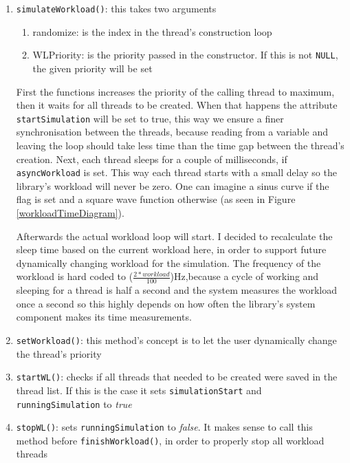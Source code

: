 \begin{enumerate}
	\item \texttt{simulateWorkload()}: this takes two arguments
	\begin{enumerate}
		\item randomize: is the index in the thread's construction loop
		\item WLPriority: is the priority passed in the constructor. If this is not \texttt{NULL}, the given priority will be set
	\end{enumerate}
	First the functions increases the priority of the calling thread to maximum, then it waits for all threads to be created. When that happens the attribute \texttt{startSimulation} will be set to true, this way we ensure a finer synchronisation between the threads, because reading from a variable and leaving the loop should take less time than the time gap between the thread's creation. Next, each thread sleeps for a couple of milliseconds, if \texttt{asyncWorkload} is set. This way each thread starts with a small delay so the library's workload will never be zero. One can imagine a sinus curve if the flag is set and a square wave function otherwise (as seen in Figure \ref*{workloadTimeDiagram}).
	\begin{figure*}[!htb]
		\centering
		\caption{Workload Time Diagrams} 
		\label{workloadTimeDiagram}
	\end{figure*}
	Afterwards the actual workload loop will start. I decided to recalculate the sleep time based on the current workload here, in order to support future dynamically changing workload for the simulation. The frequency of the workload is hard coded to ($\frac{2*workload}{100}$)Hz,because a cycle of working and sleeping for a thread is half a second and the system measures the workload once a second so this highly depends on how often the library's system component makes its time measurements.	
	\item \texttt{setWorkload()}: this method's concept is to let the user dynamically change the thread's priority 
	\item \texttt{startWL()}: checks if all threads that needed to be created were saved in the thread list. If this is the case it sets \texttt{simulationStart} and \texttt{runningSimulation} to \textit{true}
	\item \texttt{stopWL()}: sets \texttt{runningSimulation} to \textit{false}. It makes sense to call this method before \texttt{finishWorkload()}, in order to properly stop all workload threads
\end{enumerate}
